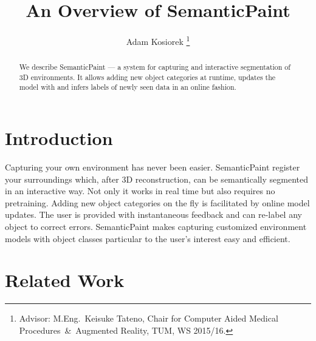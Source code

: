 \documentclass{llncs}
\begin{document}
	\title{An Overview of SemanticPaint}
	\author{Adam Kosiorek
	\thanks{Advisor: M.Eng.~Keisuke Tateno, Chair for Computer Aided Medical Procedures~\&~Augmented Reality, TUM, WS 2015/16.}}
	\institute{}
	\maketitle

\begin{abstract}
  We describe SemanticPaint \cite{SemanticPaint} --- a system for capturing and  interactive segmentation of 3D environments. It allows adding new object categories at runtime, updates the model with and infers labels of newly seen data in an online fashion. 
\end{abstract}

\section{Introduction}
  
  Capturing your own environment has never been easier. SemanticPaint \cite{SemanticPaint} register your surroundings which, after 3D reconstruction, can be semantically segmented in an interactive way. Not only it works in real time but also requires no pretraining. Adding new object categories on the fly is facilitated by online model updates. The user is provided with instantaneous feedback and can re-label any object to correct errors. SemanticPaint makes capturing customized environment models with object classes particular to the user's interest easy and efficient.  
 
\section{Related Work}
\end{document}
